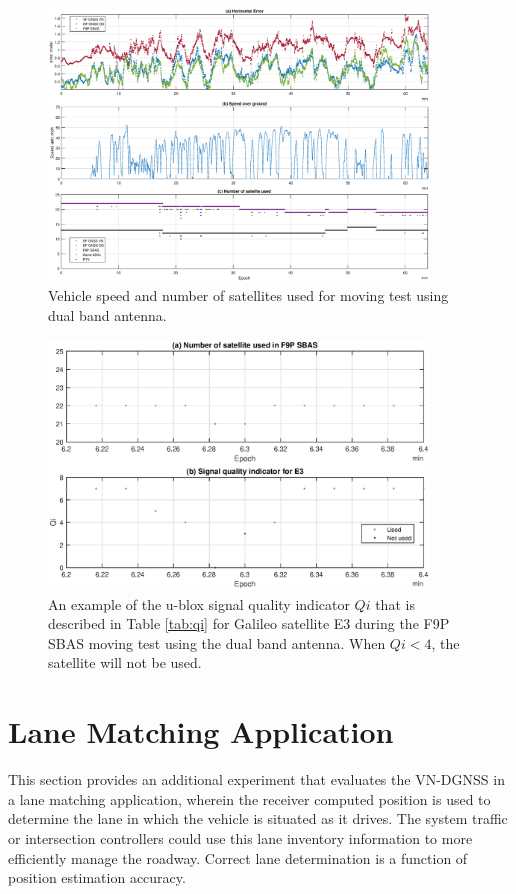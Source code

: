 \documentclass[letterpaper, 10 pt,onecolumn]{article}
\begin{document}
	\begin{figure}[H]
		\centering
		\includegraphics[width=0.9\textwidth]{figures/dynamicinfo_dual.eps}
		\caption{Vehicle speed and number of satellites used for moving test using dual band antenna.}
		\label{fig:m2vspeed}
	\end{figure}
	
	\begin{figure}[H]		
		\centering		
		\includegraphics[width=0.9\textwidth]{figures/Qi.eps}		
		\caption{An example of the u-blox signal quality indicator $Qi$ that is described in Table \ref{tab:qi} for Galileo satellite E3  during the F9P SBAS moving test using the dual band antenna. When $Qi<4$, the satellite will not be used.}		
		\label{fig:qi}	
	\end{figure}
	
	
	\section{Lane Matching Application}
	This section provides an additional experiment that evaluates the VN-DGNSS in a lane matching application, wherein  the receiver computed position is used to determine the lane in which the vehicle is situated as it drives. The system traffic or intersection controllers could use this lane inventory information to more efficiently manage the roadway. Correct lane determination is a function of position estimation accuracy.
	
\end{document}
